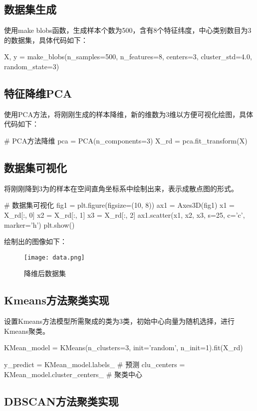 \documentclass{ctexart}
\begin{document}
\subsection{数据集生成}
使用make blobs函数，生成样本个数为500，含有8个特征纬度，中心类别数目为3的数据集，具体代码如下：
\begin{python}
X, y = make_blobs(n_samples=500, n_features=8,  centers=3,  cluster_std=4.0,  random_state=3)
\end{python}

\subsection{特征降维PCA}
使用PCA方法，将刚刚生成的样本降维，新的维数为3维以方便可视化绘图，具体代码如下：
\begin{python}
# PCA方法降维
pca = PCA(n_components=3)
X_rd = pca.fit_transform(X)
\end{python}

\subsection{数据集可视化}
将刚刚降到3为的样本在空间直角坐标系中绘制出来，表示成散点图的形式。
\begin{python}
# 数据集可视化
fig1 = plt.figure(figsize=(10, 8))
ax1 = Axes3D(fig1)
x1 = X_rd[:, 0]
x2 = X_rd[:, 1]
x3 = X_rd[:, 2]
ax1.scatter(x1, x2, x3, s=25, c='c', marker='h')
plt.show()
\end{python}

绘制出的图像如下：
\begin{figure}[H]
\texttt{[image: data.png]}
\caption{降维后数据集}
\end{figure}

\subsection{Kmeans方法聚类实现}
设置Kmeans方法模型所需聚成的类为3类，初始中心向量为随机选择，进行Kmeans聚类。
\begin{python}
KMean_model = KMeans(n_clusters=3, init='random', n_init=1).fit(X_rd)

y_predict = KMean_model.labels_  # 预测
clu_centers = KMean_model.cluster_centers_  # 聚类中心
\end{python}

\subsection{DBSCAN方法聚类实现}
\end{document}
